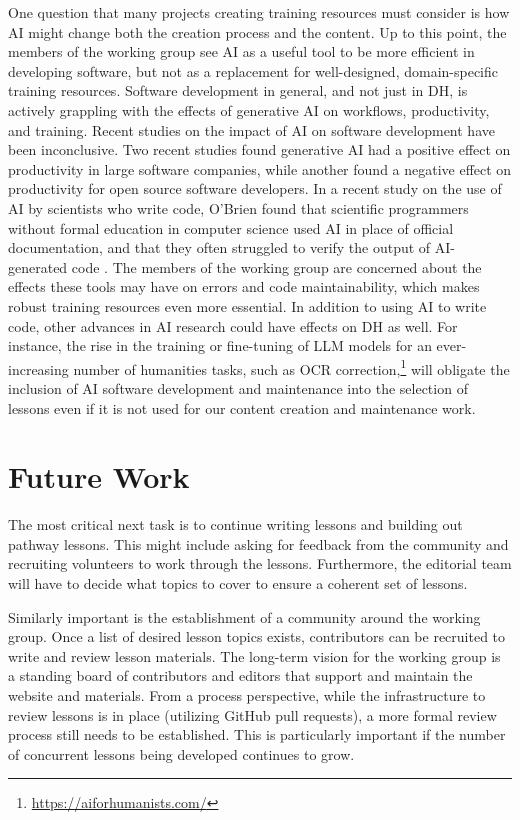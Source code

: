 \documentclass[final]{anthology-ch} %
\begin{document}
One question that many projects creating training resources must consider is how AI might change both the creation process and the content. Up to this point, the members of the working group see AI as a useful tool to be more efficient in developing software, but not as a replacement for well-designed, domain-specific training resources. Software development in general, and not just in DH, is actively grappling with the effects of generative AI on workflows, productivity, and training. Recent studies on the impact of AI on software development have been inconclusive. Two recent studies \cite{coutinho2024, cui2025} found generative AI had a positive effect on productivity in large software companies, while another \cite{becker2025} found a negative effect on productivity for open source software developers. In a recent study on the use of AI by scientists who write code, O'Brien found that scientific programmers without formal education in computer science used AI in place of official documentation, and that they often struggled to verify the output of AI-generated code \cite{obrien2025}. The members of the working group are concerned about the effects these tools may have on errors and code maintainability, which makes robust training resources even more essential. In addition to using AI to write code, other advances in AI research could have effects on DH as well. For instance, the rise in the training or fine-tuning of LLM models for an ever-increasing number of humanities tasks, such as OCR correction,\footnote{\url{https://aiforhumanists.com/}
} will obligate the inclusion of AI software development and maintenance into the selection of lessons even if it is not used for our content creation and maintenance work.


\section{Future Work}

The most critical next task is to continue writing lessons and building out pathway lessons. This might include asking for feedback from the community and recruiting volunteers to work through the lessons. Furthermore, the editorial team will have to decide what topics to cover to ensure a coherent set of lessons.

Similarly important is the establishment of a community around the working group. Once a list of desired lesson topics exists, contributors can be recruited to write and review lesson materials. The long-term vision for the working group is a standing board of contributors and editors that support and maintain the website and materials. From a process perspective, while the infrastructure to review lessons is in place (utilizing GitHub pull requests), a more formal review process still needs to be established. This is particularly important if the number of concurrent lessons being developed continues to grow.
\end{document}
